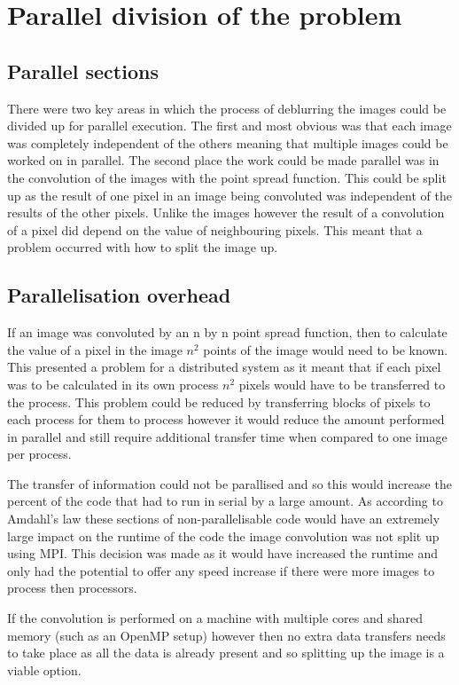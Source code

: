 \section*{Parallel division of the problem}

\subsection*{Parallel sections}
There were two key areas in which the process of deblurring the images could be divided up for parallel execution. The first and most obvious was that each image was completely independent of the others meaning that multiple images could be worked on in parallel. The second place the work could be made parallel was in the convolution of the images with the point spread function. This could be split up as the result of one pixel in an image being convoluted was independent of the results of the other pixels. Unlike the images however the result of a convolution of a pixel did depend on the value of neighbouring pixels. This meant that a problem occurred with how to split the image up.

\subsection*{Parallelisation overhead}
If an image was convoluted by an n by n point spread function, then to calculate the value of a pixel in the image \(n^2\) points of the image would need to be known. This presented a problem for a distributed system as it meant that if each pixel was to be calculated in its own process \(n^2\) pixels would have to be transferred to the process. This problem could be reduced by transferring blocks of pixels to each process for them to process however it would reduce the amount performed in parallel and still require additional transfer time when compared to one image per process.

The transfer of information could not be parallised and so this would increase the percent of the code that had to run in serial by a large amount. As according to Amdahl's law\cite{am} these sections of non-parallelisable code would have an extremely large impact on the runtime of the code the image convolution was not split up using MPI. This decision was made as it would have increased the runtime and only had the potential to offer any speed increase if there were more images to process then processors.

If the convolution is performed on a machine with multiple cores and shared memory (such as an OpenMP setup) however then no extra data transfers needs to take place as all the data is already present and so splitting up the image is a viable option.